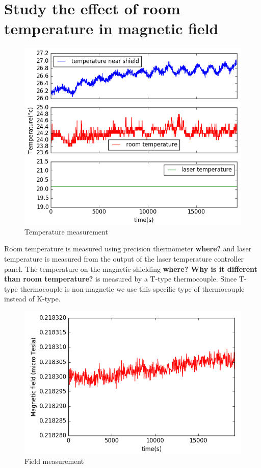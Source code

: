 \section{Study the effect of room temperature in magnetic field} 

\begin{figure}%
\centering\includegraphics[width=0.8\linewidth]{figures/temp_.png}
\caption{Temperature measurement\label{fig:temperature-measurement}}
\end{figure}
Room temperature is measured using precision thermometer {\bf where?}
and laser temperature is measured from the output of the laser
temperature controller panel. The temperature on the magnetic
shielding {\bf where?  Why is it different than room temperature?%
} is
measured by a T-type thermocouple.  Since T- type thermocouple is
non-magnetic we use this specific type of thermocouple instead of
K-type.
 
  \begin{figure}%
\centering\includegraphics[width=0.8\linewidth]{figures/field_.png}
\caption{Field measurement\label{fig:field}}
\end{figure}


